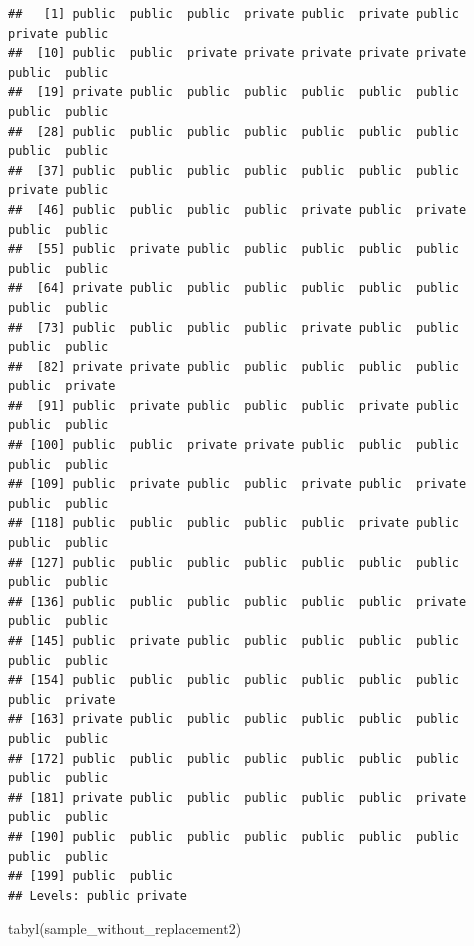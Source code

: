 \documentclass[
]{book}
\newenvironment{Shaded}{\begin{snugshade}}{\end{snugshade}}
\newcommand{\AttributeTok}[1]{\textcolor[rgb]{0.77,0.63,0.00}{#1}}
\newcommand{\DecValTok}[1]{\textcolor[rgb]{0.00,0.00,0.81}{#1}}
\newcommand{\FunctionTok}[1]{\textcolor[rgb]{0.00,0.00,0.00}{#1}}
\newcommand{\NormalTok}[1]{#1}
\newcommand{\OtherTok}[1]{\textcolor[rgb]{0.56,0.35,0.01}{#1}}
\newcommand{\SpecialCharTok}[1]{\textcolor[rgb]{0.00,0.00,0.00}{#1}}
\begin{document}
\begin{Shaded}
\end{Shaded}

\begin{verbatim}
##   [1] public  public  public  private public  private public  private public 
##  [10] public  public  private private private private private public  public 
##  [19] private public  public  public  public  public  public  public  public 
##  [28] public  public  public  public  public  public  public  public  public 
##  [37] public  public  public  public  public  public  public  private public 
##  [46] public  public  public  public  private public  private public  public 
##  [55] public  private public  public  public  public  public  public  public 
##  [64] private public  public  public  public  public  public  public  public 
##  [73] public  public  public  public  private public  public  public  public 
##  [82] private private public  public  public  public  public  public  private
##  [91] public  private public  public  public  private public  public  public 
## [100] public  public  private private public  public  public  public  public 
## [109] public  private public  public  private public  private public  public 
## [118] public  public  public  public  public  private public  public  public 
## [127] public  public  public  public  public  public  public  public  public 
## [136] public  public  public  public  public  public  private public  public 
## [145] public  private public  public  public  public  public  public  public 
## [154] public  public  public  public  public  public  public  public  private
## [163] private public  public  public  public  public  public  public  public 
## [172] public  public  public  public  public  public  public  public  public 
## [181] private public  public  public  public  public  private public  public 
## [190] public  public  public  public  public  public  public  public  public 
## [199] public  public 
## Levels: public private
\end{verbatim}

\begin{Shaded}
\begin{Highlighting}[]
\FunctionTok{tabyl}\NormalTok{(sample\_without\_replacement2)}
\end{Highlighting}
\end{Shaded}
\end{document}
